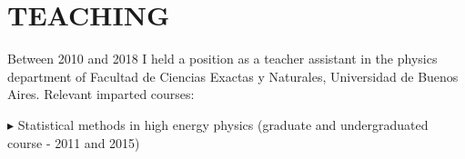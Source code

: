 \documentclass[letterpaper]{article}
\renewenvironment{itemize}{
  \begin{list}{}{
    \setlength{\leftmargin}{1.5em}
  }
}{
  \end{list}
}
\begin{document}
%  


\section*{TEACHING}

Between 2010 and 2018 I held a position as a teacher assistant in the physics department of Facultad de Ciencias Exactas y Naturales, Universidad de Buenos Aires. Relevant imparted courses:
\begin{itemize}
 \item{$\blacktriangleright$} Statistical methods in high energy physics (graduate and undergraduated course - 2011 and 2015)
\end{itemize}
\end{document}
